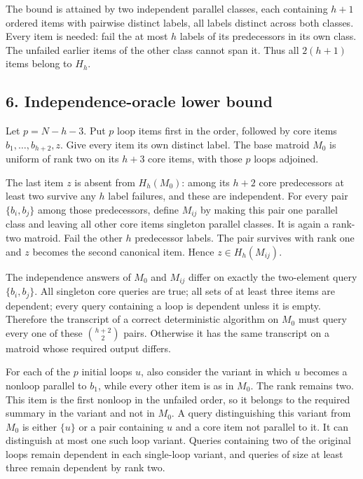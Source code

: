 The bound is attained by two independent parallel classes, each containing \(h+1\) ordered items with pairwise distinct labels, all labels distinct across both classes. Every item is needed: fail the at most \(h\) labels of its predecessors in its own class. The unfailed earlier items of the other class cannot span it. Thus all \(2(h+1)\) items belong to \(H_h\).

\hypertarget{af-b41875cb6e-independence-oracle-lower-bound}{%
\subsection{6. Independence-oracle lower bound}\label{af-b41875cb6e-independence-oracle-lower-bound}}

Let \(p=N-h-3\). Put \(p\) loop items first in the order, followed by core items \(b_1,\ldots,b_{h+2},z\). Give every item its own distinct label. The base matroid \(M_0\) is uniform of rank two on its \(h+3\) core items, with those \(p\) loops adjoined.

The last item \(z\) is absent from \(H_h(M_0)\): among its \(h+2\) core predecessors at least two survive any \(h\) label failures, and these are independent. For every pair \(\{b_i,b_j\}\) among those predecessors, define \(M_{ij}\) by making this pair one parallel class and leaving all other core items singleton parallel classes. It is again a rank-two matroid. Fail the other \(h\) predecessor labels. The pair survives with rank one and \(z\) becomes the second canonical item. Hence \(z\in H_h(M_{ij})\).

The independence answers of \(M_0\) and \(M_{ij}\) differ on exactly the two-element query \(\{b_i,b_j\}\). All singleton core queries are true; all sets of at least three items are dependent; every query containing a loop is dependent unless it is empty. Therefore the transcript of a correct deterministic algorithm on \(M_0\) must query every one of these \(\binom{h+2}{2}\) pairs. Otherwise it has the same transcript on a matroid whose required output differs.

For each of the \(p\) initial loops \(u\), also consider the variant in which \(u\) becomes a nonloop parallel to \(b_1\), while every other item is as in \(M_0\). The rank remains two. This item is the first nonloop in the unfailed order, so it belongs to the required summary in the variant and not in \(M_0\). A query distinguishing this variant from \(M_0\) is either \(\{u\}\) or a pair containing \(u\) and a core item not parallel to it. It can distinguish at most one such loop variant. Queries containing two of the original loops remain dependent in each single-loop variant, and queries of size at least three remain dependent by rank two.

